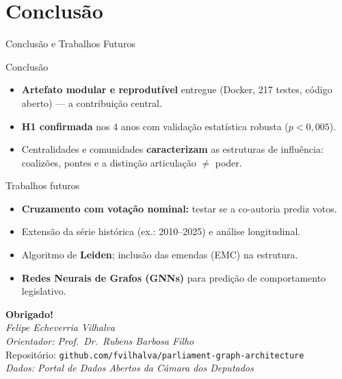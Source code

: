 \documentclass{beamer}
\begin{document}
\section{Conclusão}

\begin{frame}{Conclusão e Trabalhos Futuros}
\begin{block}{Conclusão}
\begin{itemize}\footnotesize
  \item \textbf{Artefato modular e reprodutível} entregue (Docker, 217 testes, código aberto) — a contribuição central.
  \item \textbf{H1 confirmada} nos 4 anos com validação estatística robusta ($p < 0{,}005$).
  \item Centralidades e comunidades \textbf{caracterizam} as estruturas de influência: coalizões, pontes e a distinção articulação $\neq$ poder.
\end{itemize}
\end{block}

\begin{block}{Trabalhos futuros}
\begin{itemize}\footnotesize
  \item \textbf{Cruzamento com votação nominal:} testar se a co-autoria prediz votos.
  \item Extensão da série histórica (ex.: 2010--2025) e análise longitudinal.
  \item Algoritmo de \textbf{Leiden}; inclusão das emendas (EMC) na estrutura.
  \item \textbf{Redes Neurais de Grafos (GNNs)} para predição de comportamento legislativo.
\end{itemize}
\end{block}
\end{frame}

\begin{frame}
  \centering
  \vspace{1cm}
  {\Large \textbf{Obrigado!}}\\[1cm]
  \textit{Felipe Echeverria Vilhalva}\\
  \textit{Orientador: Prof.\ Dr.\ Rubens Barbosa Filho}\\[0.5cm]
  \small
  Repositório: \texttt{github.com/fvilhalva/parliament-graph-architecture}\\[0.3cm]
  \textit{Dados: Portal de Dados Abertos da Câmara dos Deputados}
\end{frame}
\end{document}
